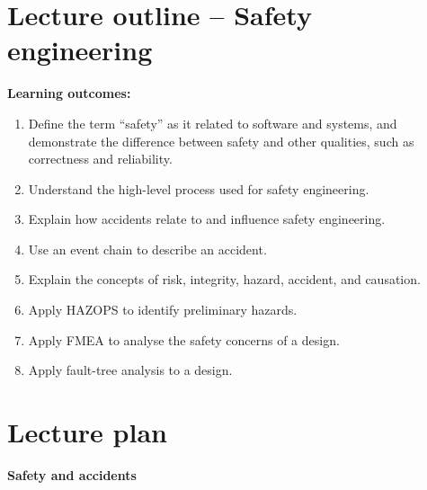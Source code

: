\documentclass[11pt]{article}
\begin{document}
\section*{Lecture outline -- Safety engineering}

{\bf Learning outcomes:} 

 \begin{enumerate}
  
  \item Define the term ``safety'' as it related to software and systems, and demonstrate the difference between safety and other qualities, such as correctness and reliability.

  \item Understand the high-level process used for safety engineering.

  \item Explain how accidents relate to and influence safety engineering.

  \item Use an event chain to describe an accident.

  \item Explain the concepts of risk, integrity, hazard, accident, and causation.

  \item Apply HAZOPS to identify preliminary hazards.

  \item Apply FMEA to analyse the safety concerns of a design.

  \item Apply fault-tree analysis to a design.

 \end{enumerate}

\section*{Lecture plan}

\textbf{Safety and accidents}
\end{document}
